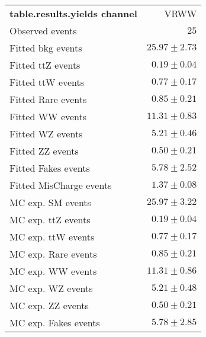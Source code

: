 

\begin{table}
\begin{center}
\setlength{\tabcolsep}{0.0pc}
{\small
\begin{tabular*}{\textwidth}{@{\extracolsep{\fill}}lr}
\noalign{\smallskip}\hline\noalign{\smallskip}
{\bf table.results.yields channel}           & VRWW              \\[-0.05cm]
\noalign{\smallskip}\hline\noalign{\smallskip}
Observed events          & $25$                    \\
\noalign{\smallskip}\hline\noalign{\smallskip}
Fitted bkg events         & $25.97 \pm 2.73$              \\
\noalign{\smallskip}\hline\noalign{\smallskip}
        Fitted ttZ events         & $0.19 \pm 0.04$              \\
        Fitted ttW events         & $0.77 \pm 0.17$              \\
        Fitted Rare events         & $0.85 \pm 0.21$              \\
        Fitted WW events         & $11.31 \pm 0.83$              \\
        Fitted WZ events         & $5.21 \pm 0.46$              \\
        Fitted ZZ events         & $0.50 \pm 0.21$              \\
        Fitted Fakes events         & $5.78 \pm 2.52$              \\
        Fitted MisCharge events         & $1.37 \pm 0.08$              \\
 \noalign{\smallskip}\hline\noalign{\smallskip}
MC exp. SM events              & $25.97 \pm 3.22$              \\
\noalign{\smallskip}\hline\noalign{\smallskip}
        MC exp. ttZ events         & $0.19 \pm 0.04$              \\
        MC exp. ttW events         & $0.77 \pm 0.17$              \\
        MC exp. Rare events         & $0.85 \pm 0.21$              \\
        MC exp. WW events         & $11.31 \pm 0.86$              \\
        MC exp. WZ events         & $5.21 \pm 0.48$              \\
        MC exp. ZZ events         & $0.50 \pm 0.21$              \\
        MC exp. Fakes events         & $5.78 \pm 2.85$              \\

\end{tabular*}}
\end{center}
\end{table}
